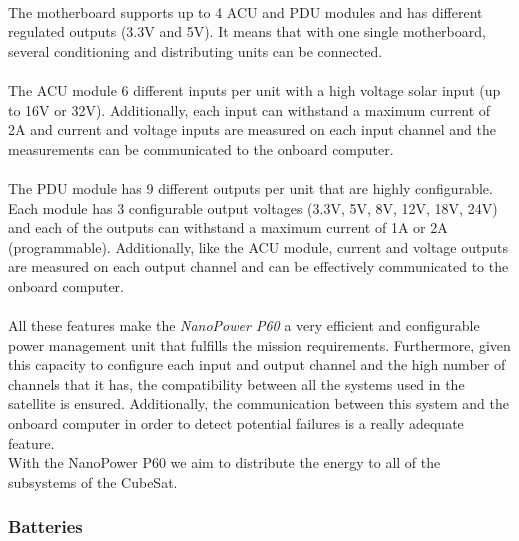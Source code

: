 \paragraph{}The motherboard supports up to 4 ACU and PDU modules and has different regulated outputs (3.3V and 5V). It means that with one single motherboard, several conditioning and distributing units can be connected.

\paragraph{}The ACU module 6 different inputs per unit with a high voltage solar input (up to 16V or 32V). Additionally, each input can withstand a maximum current of 2A and current and voltage inputs are measured on each input channel and the measurements can be communicated to the onboard computer.

\paragraph{}The PDU module has 9 different outputs per unit that are highly configurable. Each module has 3 configurable output voltages (3.3V, 5V, 8V, 12V, 18V, 24V) and each of the outputs can withstand a maximum current of 1A or 2A (programmable). Additionally, like the ACU module, current and voltage outputs are measured on each output channel and can be effectively communicated to the onboard computer.

\paragraph{}All these features make the \textit{NanoPower P60} a very efficient and configurable power management unit that fulfills the mission requirements. Furthermore, given this capacity to configure each input and output channel and the high number of channels that it has, the compatibility between all the systems used in the satellite is ensured. Additionally, the communication between this system and the onboard computer in order to detect potential failures is a really adequate feature.\\
With the NanoPower P60 we aim to distribute the energy to all of the subsystems of the CubeSat.

\subsubsection{Batteries}

